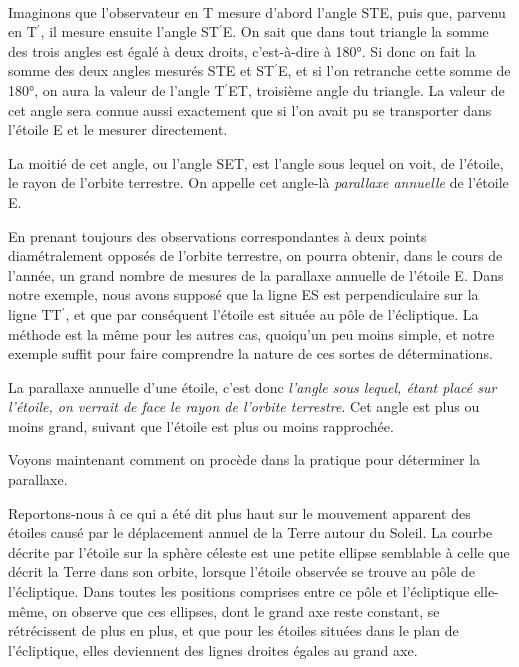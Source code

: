 \documentclass[a4paper, 11pt, oneside]{article}
\begin{document}
\paragraph{}
Imaginons que l'observateur en T mesure d'abord l'angle STE, puis que, parvenu en T$^{\prime}$, il mesure ensuite l'angle ST$^{\prime}$E. On sait que dans tout triangle la somme des trois angles est égalé à deux droits, c'est-à-dire à 180°. Si donc on fait la somme des deux angles mesurés STE et ST$^{\prime}$E, et si l'on retranche cette somme de 180°, on aura la valeur de l'angle T$^{\prime}$ET, troisième angle du triangle. La valeur de cet angle sera connue aussi exactement que si l'on avait pu se transporter dans l'étoile E et le mesurer directement.

La moitié de cet angle, ou l'angle SET, est l'angle sous lequel on voit, de l'étoile, le rayon de l'orbite terrestre. On appelle cet angle-là \emph{parallaxe annuelle} de l'étoile E.

En prenant toujours des observations correspondantes à deux points diamétralement opposés de l'orbite terrestre, on pourra obtenir, dans le cours de l'année, un grand nombre de mesures de la parallaxe annuelle de l'étoile E. Dans notre exemple, nous avons supposé que la ligne ES est perpendiculaire sur la ligne TT$^{\prime}$, et que par conséquent l'étoile est située au pôle de l'écliptique. La méthode est la même pour les autres cas, quoiqu'un peu moins simple, et notre exemple suffit pour faire comprendre la nature de ces sortes de déterminations.

La parallaxe annuelle d'une étoile, c'est donc \emph{l'angle sous lequel, étant placé sur l'étoile, on verrait de face le rayon de l'orbite terrestre}. Cet angle est plus ou moins grand, suivant que l'étoile est plus ou moins rapprochée.

Voyons maintenant comment on procède dans la pratique pour déterminer la parallaxe.

Reportons-nous à ce qui a été dit plus haut sur le mouvement apparent des étoiles causé par le déplacement annuel de la Terre autour du Soleil. La courbe décrite par l'étoile sur la sphère céleste est une petite ellipse semblable à celle que décrit la Terre dans son orbite, lorsque l'étoile observée se trouve au pôle de l'écliptique. Dans toutes les positions comprises entre ce pôle et l'écliptique elle-même, on observe que ces ellipses, dont le grand axe reste constant, se rétrécissent de plus en plus, et que pour les étoiles situées dans le plan de l'écliptique, elles deviennent des lignes droites égales au grand axe.
\end{document}
